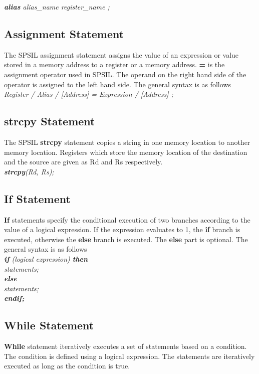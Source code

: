 \documentclass[11pt]{article}
\begin{document}
\indent \textit{ \textbf{alias}  alias\_name register\_name ;} \\


\subsection{Assignment Statement}
The SPSIL assignment statement assigns the value of an  expression or value stored in a memory address to a register or a memory address. \textbf{=} is the assignment operator used in SPSIL. The operand on the right hand side of the operator is assigned to the left hand side. The general syntax is as follows \\

\indent \textit{ Register / Alias / [Address] = Expression / [Address] ;}

\subsection{strcpy Statement}
The SPSIL \textbf{strcpy} statement copies a string in one memory location to another memory location. Registers which store the  memory location of the destination and the source are given as R{\tiny d} and R{\tiny s} respectively.\\
\indent \textit{ \textbf{strcpy}(R{\tiny d}, R{\tiny s});}

\subsection{If Statement}
\textbf{If} statements specify the conditional execution of two branches according to the value of a logical expression. If the expression evaluates to 1, the \textbf{if} branch is executed, otherwise the \textbf{else}  branch is executed. The \textbf{else} part is optional. The general syntax is as follows  \\

\textit{
\textbf{if} (logical expression) \textbf{then}  \\
 \indent \indent statements; \\
\indent \textbf{else} \\
\indent  \indent statements; \\
\indent \textbf{endif;}  \\
}



\subsection{While Statement}
\textbf{While} statement iteratively executes a set of statements based on a condition. The condition is defined using a logical expression.  The statements are iteratively executed as long as the condition is true.\\
\end{document}
